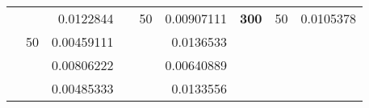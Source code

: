 \begin{table}[H]
\begin{tabular}{|ccrccrccc}
\rowcolor[HTML]{DDFDFF} 
\multicolumn{1}{|c|}{\cellcolor[HTML]{FFFFC7}}                                & \multicolumn{1}{c|}{\cellcolor[HTML]{DDFDFF}}                      & \multicolumn{1}{r|}{\cellcolor[HTML]{DAE8FC}0.0122844}   & \multicolumn{1}{c|}{\cellcolor[HTML]{FFFFC7}}                                & \multicolumn{1}{c|}{\multirow{-10}{*}{\cellcolor[HTML]{DDFDFF}50}}  & \multicolumn{1}{r|}{\cellcolor[HTML]{DDFDFF}0.00907111}  & \multicolumn{1}{c|}{\multirow{-19}{*}{\cellcolor[HTML]{FFFFC7}\textbf{300}}} & \multicolumn{1}{c|}{\multirow{-10}{*}{\cellcolor[HTML]{DDFDFF}50}} & \multicolumn{1}{r|}{\cellcolor[HTML]{DDFDFF}0.0105378}   \\ \cline{3-3} \cline{5-9} 
\multicolumn{1}{|c|}{\cellcolor[HTML]{FFFFC7}}                                & \multicolumn{1}{c|}{\multirow{-10}{*}{\cellcolor[HTML]{DDFDFF}50}} & \multicolumn{1}{r|}{\cellcolor[HTML]{DDFDFF}0.00459111}  & \multicolumn{1}{c|}{\cellcolor[HTML]{FFFFC7}}                                & \multicolumn{1}{c|}{\cellcolor[HTML]{DAE8FC}}                       & \multicolumn{1}{r|}{\cellcolor[HTML]{DAE8FC}0.0136533}   &                                                                              &                                                                    &                                                          \\ \cline{2-3} \cline{6-6}
\multicolumn{1}{|c|}{\cellcolor[HTML]{FFFFC7}}                                & \multicolumn{1}{c|}{\cellcolor[HTML]{DAE8FC}}                      & \multicolumn{1}{r|}{\cellcolor[HTML]{DAE8FC}0.00806222}  & \multicolumn{1}{c|}{\cellcolor[HTML]{FFFFC7}}                                & \multicolumn{1}{c|}{\cellcolor[HTML]{DAE8FC}}                       & \multicolumn{1}{r|}{\cellcolor[HTML]{DDFDFF}0.00640889}  &                                                                              &                                                                    &                                                          \\ \cline{3-3} \cline{6-6}
\multicolumn{1}{|c|}{\cellcolor[HTML]{FFFFC7}}                                & \multicolumn{1}{c|}{\cellcolor[HTML]{DAE8FC}}                      & \multicolumn{1}{r|}{\cellcolor[HTML]{DDFDFF}0.00485333}  & \multicolumn{1}{c|}{\cellcolor[HTML]{FFFFC7}}                                & \multicolumn{1}{c|}{\cellcolor[HTML]{DAE8FC}}                       & \multicolumn{1}{r|}{\cellcolor[HTML]{DAE8FC}0.0133556}   &                                                                              &                                                                    &                                                          \\ \cline{3-3} \cline{6-6}

\end{tabular}
\end{table}
